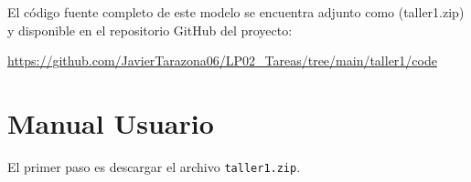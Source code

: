 \documentclass{article}
\begin{document}
El código fuente completo de este modelo se encuentra adjunto como 
(taller1.zip)
y disponible en el repositorio GitHub del proyecto:

\begin{center}
\url{https://github.com/JavierTarazona06/LP02_Tareas/tree/main/taller1/code}
\end{center}


\section{Manual Usuario}\label{sec:man_u}

El primer paso es descargar el archivo \texttt{taller1.zip}.
\end{document}
